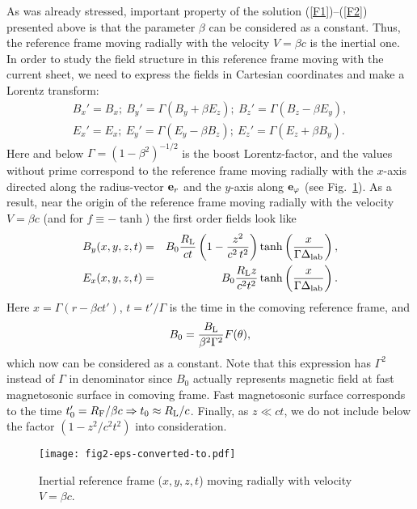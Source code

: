 \documentclass[useAMS,usenatbib]{mn2e}
\begin{document}
As was already stressed, important property of the solution (\ref{F1})--(\ref{F2}) 
presented above is that the parameter $\beta$ can be considered as a constant. Thus, the
reference frame moving radially with the velocity $V = \beta c$ is the inertial one. 
In order to study the field structure in this reference frame moving with the current sheet,
we need to express the fields in Cartesian coordinates and make a Lorentz transform:
\begin{eqnarray}
B_x'=B_x;~B_y'=\Gamma (B_y+ \beta E_z);~B_z' = \Gamma (B_z - \beta E_y), \\
E_x'=E_x;~E_y'=\Gamma (E_y - \beta B_z);~E_z'=\Gamma(E_z+\beta B_y).
\end{eqnarray}
Here and below $\Gamma = (1-\beta^2)^{-1/2}$ is the boost Lorentz-factor, and the values 
without prime correspond to the reference frame moving radially with the $x$-axis  
directed along the radius-vector ${\bf e}_{r}$ and the $y$-axis along ${\bf e}_{\varphi}$ 
(see Fig.~\ref{Fig02}). As a result, near the origin of the reference frame moving radially with 
the velocity $V = \beta c$ (and for $f \equiv -\tanh$) the first order fields look like 
\begin{eqnarray}
B_{y}(x, y, z, t) & = & B_{0}\frac{R_{\rm L}}{c t}
\left(1 - \frac{z^2}{c^2\,t^2}\right)
\tanh \left(\frac{x}{\Gamma \Delta_{\rm lab}} \right),
\label{BYinitial} \\
E_{x}(x, y, z, t) & = & B_{0}\frac{R_{\rm L} z}{c^2t^2} \tanh
\left(\frac{x}{\Gamma \Delta_{\rm lab}} \right).
\label{EXinitial}
\end{eqnarray}
Here $x = \Gamma(r-\beta c t')$, $t = t'/\Gamma$ is the time in the comoving 
reference frame, and
\begin{equation}
B_{0} = \frac{B_{\rm L}}{\beta^2 \Gamma^2} F(\theta),
\label{B00}
\end{equation}
which now can be considered as a constant. Note that this expression 
has $\Gamma^2$ instead of $\Gamma$ in denominator since $B_0$ actually
represents magnetic field at fast magnetosonic surface in comoving 
frame. Fast magnetosonic surface corresponds to the time 
$t_0' = R_{\rm F}/\beta c \Rightarrow t_0 \approx R_{\rm L}/c$.
{ Finally, as $z \ll ct$, we do not include below the factor
$(1 - z^2/c^{2}t^{2})$ into consideration.}

\begin{figure}
\centering
\texttt{[image: fig2-eps-converted-to.pdf]}
\caption{Inertial reference frame ($x, y, z, t$) moving radially with velocity $V =\beta c$.}
\label{Fig02}
\end{figure}
\end{document}

